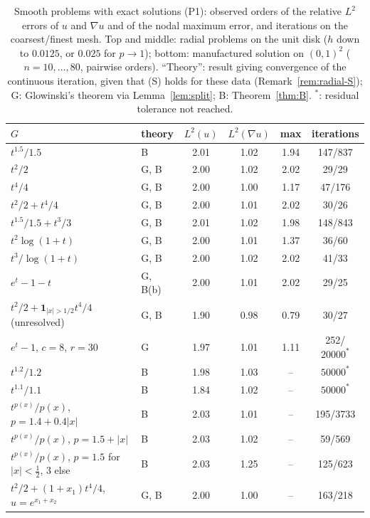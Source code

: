 \documentclass[11pt]{amsart}
\theoremstyle{definition}
\theoremstyle{remark}
\numberwithin{equation}{section}
\newcommand{\abs}[1]{\lvert #1\rvert}
\begin{document}
\begin{table}[t]
\caption{Smooth problems with exact solutions (P1): observed orders of the relative $L^2$ errors of $u$ and $\nabla u$ and of the nodal maximum error, and iterations on the coarsest/finest mesh. Top and middle: radial problems on the unit disk ($h$ down to $0.0125$, or $0.025$ for $p\to1$); bottom: manufactured solution on $(0,1)^2$ ($n=10,\dots,80$, pairwise orders). ``Theory'': result giving convergence of the continuous iteration, given that (S) holds for these data (Remark~\ref{rem:radial-S}); G: Glowinski's theorem via Lemma~\ref{lem:split}; B: Theorem~\ref{thm:B}. $^*$: residual tolerance not reached.}\label{tab:orders}
\small
\begin{tabular}{@{}llcccc@{}}
\toprule
$G$ & theory & $L^2(u)$ & $L^2(\nabla u)$ & max & iterations\\
\midrule
$t^{1.5}/1.5$ & B & 2.01 & 1.02 & 1.94 & 147/837\\
$t^2/2$ & G, B & 2.00 & 1.02 & 2.02 & 29/29\\
$t^4/4$ & G, B & 2.00 & 1.00 & 1.17 & 47/176\\
$t^2/2+t^4/4$ & G, B & 2.00 & 1.01 & 2.02 & 30/26\\
$t^{1.5}/1.5+t^3/3$ & G, B & 2.01 & 1.02 & 1.98 & 148/843\\
$t^2\log(1+t)$ & G, B & 2.00 & 1.01 & 1.37 & 36/60\\
$t^3/\log(1+t)$ & G, B & 2.00 & 1.02 & 2.02 & 41/33\\
$e^t-1-t$ & G, B(b) & 2.00 & 1.01 & 2.02 & 29/25\\
$t^2/2+\mathbf 1_{\abs x>1/2}t^4/4$ (unresolved) & G, B & 1.90 & 0.98 & 0.79 & 30/27\\
$e^t-1$, $c=8$, $r=30$ & G & 1.97 & 1.01 & 1.11 & 252/$20000^*$\\
\midrule
$t^{1.2}/1.2$ & B & 1.98 & 1.03 & -- & $50000^*$\\
$t^{1.1}/1.1$ & B & 1.84 & 1.02 & -- & $50000^*$\\
$t^{p(x)}/p(x)$, $p=1.4+0.4\abs x$ & B & 2.03 & 1.01 & -- & 195/3733\\
$t^{p(x)}/p(x)$, $p=1.5+\abs x$ & B & 2.03 & 1.02 & -- & 59/569\\
$t^{p(x)}/p(x)$, $p=1.5$ for $\abs x<\frac12$, $3$ else & B & 2.03 & 1.25 & -- & 125/623\\
\midrule
$t^2/2+(1+x_1)t^4/4$, $u=e^{x_1+x_2}$ & G, B & 2.00 & 1.00 & -- & 163/218\\
\bottomrule
\end{tabular}
\end{table}
\end{document}
